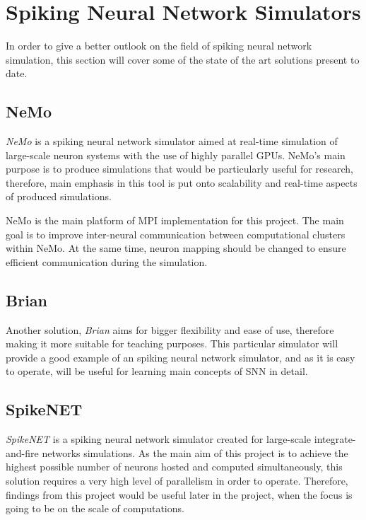 \section{Spiking Neural Network Simulators}

In order to give a better outlook on the field of spiking neural network simulation, this section will cover some of the state of the art solutions present to date.

\subsection{NeMo}

\emph{NeMo} is a spiking neural network simulator aimed at real-time simulation of large-scale neuron systems with the use of highly parallel GPUs.\cite{AndreasK.Fidjeland2009}
NeMo's main purpose is to produce simulations that would be particularly useful for research, therefore, main emphasis in this tool is put onto scalability and real-time aspects
of produced simulations.

NeMo is the main platform of MPI implementation for this project. The main goal is to improve inter-neural communication between computational clusters within NeMo.
At the same time, neuron mapping should be changed to ensure efficient communication during the simulation. 

\subsection{Brian}

Another solution, \emph{Brian} aims for bigger flexibility and ease of use, therefore making it more suitable for teaching purposes. \cite{Goodman2008} This
particular simulator will provide a good example of an spiking neural network simulator, and as it is easy to operate, will be useful for learning main concepts
of SNN in detail.

\subsection{SpikeNET}

\emph{SpikeNET} is a spiking neural network simulator created for large-scale integrate-and-fire networks simulations.\cite{ArnaudDelorme1999} As the main aim of this project is to
achieve the highest possible number of neurons hosted and computed simultaneously, this solution requires a very high level of parallelism in order to operate.
Therefore, findings from this project would be useful later in the project, when the focus is going to be on the scale of computations.

